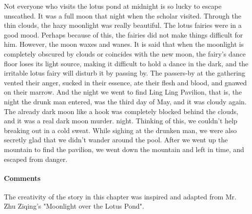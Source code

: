 Not everyone who visits the lotus pond at midnight is so lucky to escape
unscathed.  It was a full moon that night when the scholar visited. Through the
thin clouds, the hazy moonlight was really beautiful. The lotus fairies were in
a good mood. Perhaps because of this, the fairies did not make things difficult
for him.  However, the moon waxes and wanes. It is said that when the moonlight
is completely obscured by clouds or coincides with the new moon, the fairy's
dance floor loses its light source, making it difficult to hold a dance in the
dark, and the irritable lotus fairy will disturb it by passing by. The
passers-by at the gathering vented their anger, sucked in their essence, ate
their flesh and blood, and gnawed on their marrow.  And the night we went to
find Ling Ling Pavilion, that is, the night the drunk man entered, was the
third day of May, and it was cloudy again. The already dark moon like a hook
was completely blocked behind the clouds, and it was a real dark moon murder.
night.  Thinking of this, we couldn't help breaking out in a cold sweat. While
sighing at the drunken man, we were also secretly glad that we didn't wander
around the pool. After we went up the mountain to find the pavilion, we went
down the mountain and left in time, and escaped from danger. 

\vfill

\paragraph{Comments} The creativity of the story in this chapter was inspired
and adapted from Mr. Zhu Ziqing's "Moonlight over the Lotus Pond".
